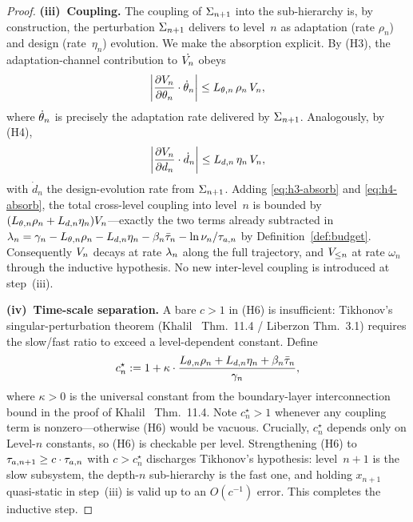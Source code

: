 \documentclass[11pt,a4paper]{article}
\begin{document}
\begin{proof}
\smallskip
\noindent\textbf{(iii)~Coupling.}  The coupling of $\Sigma_{n+1}$ into
the sub-hierarchy is, by construction, the perturbation $\Sigma_{n+1}$
delivers to level~$n$ as adaptation (rate $\rho_n$) and design
(rate~$\eta_n$) evolution.  We make the absorption explicit.  By
(H3), the adaptation-channel contribution to $\dot{V_{n}}$ obeys
\begin{equation}
  \left| \frac{\partial V_{n}}{\partial \theta_n} \cdot
         \dot{\theta}_n \right|
  \leq L_{\theta,n}\, \rho_n\, V_{n},
  \label{eq:h3-absorb}
\end{equation}
where $\dot{\theta}_n$ is precisely the adaptation rate delivered by
$\Sigma_{n+1}$.  Analogously, by (H4),
\begin{equation}
  \left| \frac{\partial V_{n}}{\partial d_n} \cdot
         \dot{d}_n \right|
  \leq L_{d,n}\, \eta_n\, V_{n},
  \label{eq:h4-absorb}
\end{equation}
with $\dot{d}_n$ the design-evolution rate from $\Sigma_{n+1}$.  Adding
\eqref{eq:h3-absorb} and \eqref{eq:h4-absorb}, the total cross-level
coupling into level~$n$ is bounded by
$(L_{\theta,n}\rho_n + L_{d,n}\eta_n)V_{n}$---exactly the two
terms already subtracted in
$\stab_n = \decay_n - L_{\param,n}\rho_n - L_{d,n}\eta_n - \beta_n\taubar_n - \ln\nu_n/\taua[n]$
by Definition~\ref{def:budget}.  Consequently $V_{n}$ decays at
rate $\lambda_n$ along the full trajectory, and $V_{\leq n}$ at
rate $\omega_n$ through the inductive hypothesis.  No new inter-level
coupling is introduced at step~(iii).

\smallskip
\noindent\textbf{(iv)~Time-scale separation.}  A bare $c > 1$ in (H6)
is insufficient: Tikhonov's singular-perturbation theorem
(Khalil~\cite{khalil2002nonlinear} Thm.~11.4 / Liberzon
\cite{liberzon2003switching} Thm.~3.1) requires the slow/fast ratio
to exceed a level-dependent constant.  Define
\begin{equation}
  c^\star_n
  := 1 + \kappa \cdot
  \frac{L_{\theta,n}\rho_n + L_{d,n}\eta_n + \beta_n\bar{\tau}_n}
       {\gamma_n},
  \label{eq:tikhonov-rate}
\end{equation}
where $\kappa > 0$ is the universal constant from the boundary-layer
interconnection bound in the proof of
Khalil~\cite{khalil2002nonlinear} Thm.~11.4.  Note $c^\star_n > 1$ whenever any coupling term is
nonzero---otherwise (H6) would be vacuous.  Crucially, $c^\star_n$
depends only on Level-$n$ constants, so (H6) is checkable per level.
Strengthening (H6) to $\taua[n+1] \geq c \cdot \taua[n]$ with
$c > c^\star_n$ discharges Tikhonov's hypothesis: level~$n+1$ is the
slow subsystem, the depth-$n$ sub-hierarchy is the fast one, and
holding $x_{n+1}$ quasi-static in step~(iii) is valid up to an
$O(c^{-1})$ error.  This completes the inductive step.


\end{proof}
\end{document}
